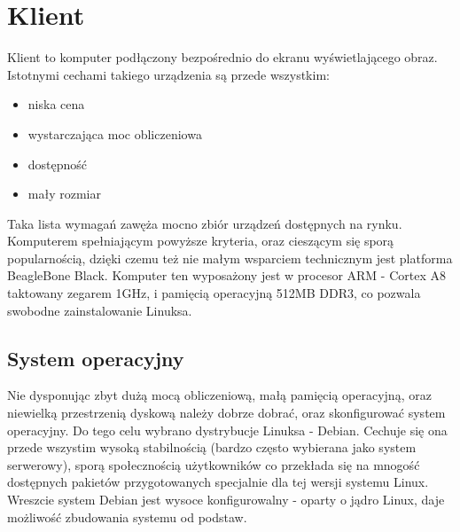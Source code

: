 \section{Klient}
\label{sec:Klient}

Klient to komputer podłączony bezpośrednio do ekranu wyświetlającego obraz. Istotnymi cechami takiego urządzenia są przede wszystkim:
\begin{itemize}
	\item niska cena
	\item wystarczająca moc obliczeniowa
	\item dostępność
	\item mały rozmiar
\end{itemize}

Taka lista wymagań zawęża mocno zbiór urządzeń dostępnych na rynku. Komputerem spełniającym powyższe kryteria, oraz cieszącym się sporą popularnością, dzięki czemu też nie małym wsparciem technicznym jest platforma BeagleBone Black. Komputer ten wyposażony jest w procesor ARM - Cortex A8 taktowany zegarem 1GHz, i pamięcią operacyjną 512MB DDR3, co pozwala swobodne zainstalowanie Linuksa. 

\subsection{System operacyjny}
\label{sub:System operacyjny}
Nie dysponując zbyt dużą mocą obliczeniową, małą pamięcią operacyjną, oraz niewielką przestrzenią dyskową należy dobrze dobrać, oraz skonfigurować system operacyjny. Do tego celu wybrano dystrybucje Linuksa - Debian. Cechuje się ona przede wszystim wysoką stabilnością (bardzo często wybierana jako system serwerowy), sporą społecznością użytkowników co przekłada się na mnogość dostępnych pakietów przygotowanych specjalnie dla tej wersji systemu Linux. Wreszcie system Debian jest wysoce konfigurowalny - oparty o jądro Linux, daje możliwość zbudowania systemu od podstaw.


